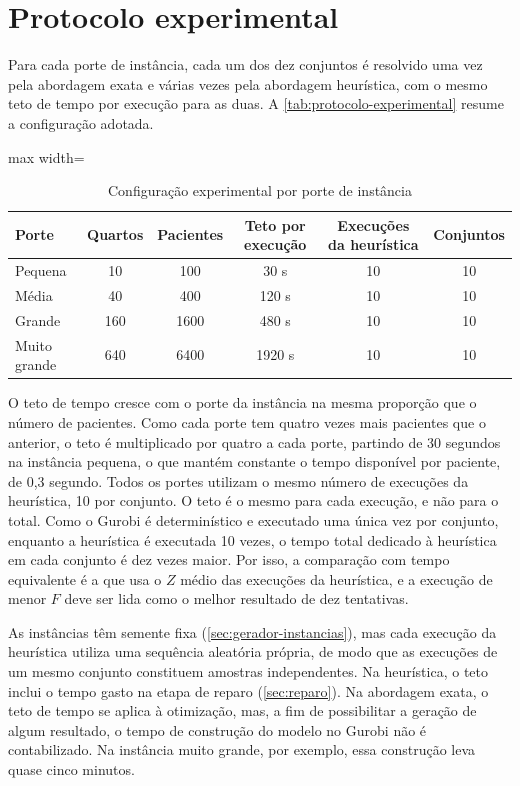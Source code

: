\section{Protocolo experimental}
\label{sec:protocolo}


Para cada porte de instância, cada um dos dez conjuntos é resolvido uma vez pela abordagem exata e várias vezes pela abordagem heurística, com o mesmo teto de tempo por execução para as duas. A \autoref{tab:protocolo-experimental} resume a configuração adotada.

\begin{table}[H]
    \centering
    \caption{Configuração experimental por porte de instância}
    \label{tab:protocolo-experimental}
    \begin{adjustbox}{max width=\textwidth}
    \begin{tabular}{lccccc}
        \hline
        \textbf{Porte} & \textbf{Quartos} & \textbf{Pacientes} & \textbf{Teto por execução} & \textbf{Execuções da heurística} & \textbf{Conjuntos} \\
        \hline
        Pequena      & 10  & 100  & 30 s   & 10 & 10 \\
        Média        & 40  & 400  & 120 s  & 10 & 10 \\
        Grande       & 160 & 1600 & 480 s  & 10 & 10 \\
        Muito grande & 640 & 6400 & 1920 s & 10 & 10 \\
        \hline
    \end{tabular}
    \end{adjustbox}
\end{table}

O teto de tempo cresce com o porte da instância na mesma proporção que o número de pacientes. Como cada porte tem quatro vezes mais pacientes que o anterior, o teto é multiplicado por quatro a cada porte, partindo de 30 segundos na instância pequena, o que mantém constante o tempo disponível por paciente, de 0,3 segundo. Todos os portes utilizam o mesmo número de execuções da heurística, 10 por conjunto. O teto é o mesmo para cada execução, e não para o total. Como o Gurobi é determinístico e executado uma única vez por conjunto, enquanto a heurística é executada 10 vezes, o tempo total dedicado à heurística em cada conjunto é dez vezes maior. Por isso, a comparação com tempo equivalente é a que usa o $Z$ médio das execuções da heurística, e a execução de menor $F$ deve ser lida como o melhor resultado de dez tentativas.

As instâncias têm semente fixa (\autoref{sec:gerador-instancias}), mas cada execução da heurística utiliza uma sequência aleatória própria, de modo que as execuções de um mesmo conjunto constituem amostras independentes. Na heurística, o teto inclui o tempo gasto na etapa de reparo (\autoref{sec:reparo}). Na abordagem exata, o teto de tempo se aplica à otimização, mas, a fim de possibilitar a geração de algum resultado, o tempo de construção do modelo no Gurobi não é contabilizado. Na instância muito grande, por exemplo, essa construção leva quase cinco minutos.


